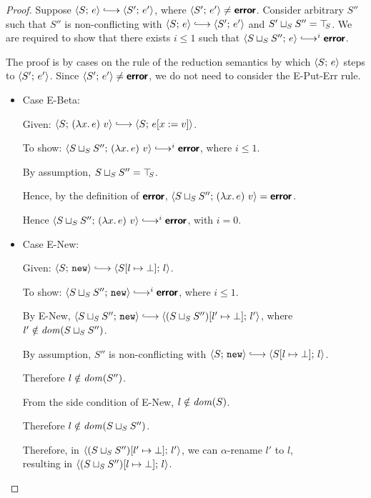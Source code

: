 \begin{proof}
  Suppose $\config{S}{e} \parstepsto \config{S'}{e'}$, where
  $\langle S';\, e' \rangle \neq \textbf{\textsf{error}}$. Consider arbitrary $S''$ such that
  $S''$ is non-conflicting with $\config{S}{e} \parstepsto
  \config{S'}{e'}$ and $S' \sqcup_{S} S'' = \top\hspace{-0.85mm}_{S}$. We are required
  to show that there exists $i \leq 1$ such that
  $\config{\lubstore{S}{S''}}{e} \parstepsto^i \error$.

  The proof is by cases on the rule of the reduction semantics by
  which $\langle S;\, e \rangle$ steps to $\langle S';\, e' \rangle$.  Since
  $\langle S';\, e' \rangle \neq \textbf{\textsf{error}}$, we do not need to consider the {\sc
    E-Put-Err} rule.
  \begin{itemize}

    \item Case {\sc E-Beta}:

      Given: $\config{S}{\app{(\lam{x}{e})}{v}} \parstepsto
      \config{S}{\subst{e}{x}{v}}$.

      To show: $\config{\lubstore{S}{S''}}{\app{(\lam{x}{e})}{v}}
      \parstepsto^i \error$, where $i \leq 1$.

      By assumption, $S \sqcup_{S} S'' = \top\hspace{-0.85mm}_{S}$.

      Hence, by the definition of $\textbf{\textsf{error}}$,
      $\langle S \sqcup_{S} S'';\, (\lambda x.\,e)~v \rangle = \textbf{\textsf{error}}$.

      Hence $\config{\lubstore{S}{S''}}{\app{(\lam{x}{e})}{v}}
      \parstepsto^i \error$, with $i = 0$.

    \item Case {\sc E-New}:

      Given: $\config{S}{\NEW} \parstepsto
      \config{\extSRaw{S}{l}{\bot}}{l}$.

      To show: $\config{\lubstore{S}{S''}}{\NEW} \parstepsto^i
      \error$, where $i \leq 1$.

      By {\sc E-New}, $\config{\lubstore{S}{S''}}{\NEW} \parstepsto
      \config{\extSRaw{(\lubstore{S}{S''})}{l'}{\bot}}{l'}$, where $l'
      \notin \mathit{dom}(S \sqcup_{S} S'')$.

      By assumption, $S''$ is non-conflicting with $\config{S}{\NEW}
      \parstepsto \config{\extSRaw{S}{l}{\bot}}{l}$.
 
      Therefore $l \notin \mathit{dom}(S'')$.

      From the side condition of {\sc E-New}, $l \notin \mathit{dom}(S)$.

      Therefore $l \notin \mathit{dom}(S \sqcup_{S} S'')$.

      Therefore, in
      $\langle (S \sqcup_{S} S'')[l' \mapsto \bot];\, l' \rangle$, we can
      $\alpha$-rename $l'$ to $l$, \\ resulting in
      $\langle (S \sqcup_{S} S'')[l \mapsto \bot];\, l \rangle$.


\end{itemize}
\end{proof}
